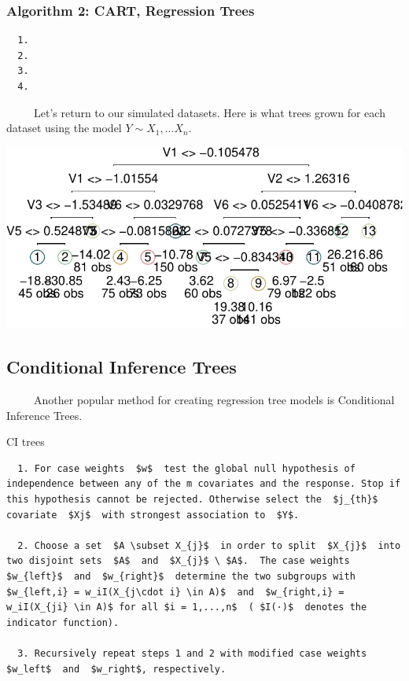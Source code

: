 \documentclass[12pt,twoside]{reedthesis}
\begin{document}
  \subsubsection{Algorithm 2: CART, Regression
  Trees}\label{algorithm-2-cart-regression-trees}
  
  \begin{verbatim}
  1.
  2.
  3.
  4.
  \end{verbatim}
  
  ~~~~~Let's return to our simulated datasets. Here is what trees grown
  for each dataset using the model \(Y\sim X_1,...X_n\).
  
  \begin{center}\includegraphics{Thesis_files/figure-latex/unnamed-chunk-10-1} \end{center}
  
  \subsection{Conditional Inference
  Trees}\label{conditional-inference-trees}
  
  ~~~~~Another popular method for creating regression tree models is
  Conditional Inference Trees.
  
  CI trees
  
  \begin{verbatim}
  1. For case weights  $w$  test the global null hypothesis of independence between any of the m covariates and the response. Stop if this hypothesis cannot be rejected. Otherwise select the  $j_{th}$  covariate  $Xj$  with strongest association to  $Y$.
  
  2. Choose a set  $A \subset X_{j}$  in order to split  $X_{j}$  into two disjoint sets  $A$  and  $X_{j}$ \ $A$.  The case weights  $w_{left}$  and  $w_{right}$  determine the two subgroups with  $w_{left,i} = w_iI(X_{j\cdot i} \in A)$  and  $w_{right,i} = w_iI(X_{ji} \in A)$ for all $i = 1,...,n$  ( $I(·)$  denotes the indicator function). 
  
  3. Recursively repeat steps 1 and 2 with modified case weights  $w_left$  and  $w_right$, respectively. 
  \end{verbatim}
  
\end{document}

